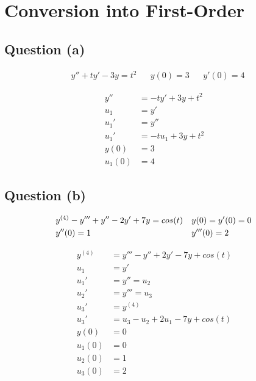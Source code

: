 \section{Conversion into First-Order}
	\subsection{Question (a)}
		\begin{align}
			&y'' + ty' - 3y = t^{2}&
			&y(0) = 3&
			&y'(0) = 4&
		\end{align}

		\begin{align}
			y'' &= -ty' + 3y  + t^{2}& \\
			u_{1} &= y'& \\
			u_{1}' &= y''& \\
			u_{1}' &= -tu_{1} + 3y + t^{2}& \\
			y(0) &= 3& \\
			u_{1}(0) &= 4&
		\end{align}

	\subsection{Question (b)}
		\begin{align}
			&y^{(4)} - y''' + y'' - 2y' + 7y = cos(t)&
			&y(0) = y'(0) = 0& \notag \\
			&y''(0) = 1&
			&y'''(0) = 2&
		\end{align}

		\begin{align}
			y^{(4)} &= y''' - y'' + 2y' - 7y + cos(t)& \\
			u_{1} &= y'& \\
			u_{1}' &= y'' = u_{2}& \\
			u_{2}' &= y''' = u_{3}& \\
			u_{3}' &= y^{(4)}& \\
			u_{3}' &= u_{3} - u_{2} + 2u_{1} - 7y + cos(t) \\
			y(0) &= 0& \\
			u_{1}(0) &= 0& \\
			u_{2}(0) &= 1& \\
			u_{3}(0) &= 2&
		\end{align}
